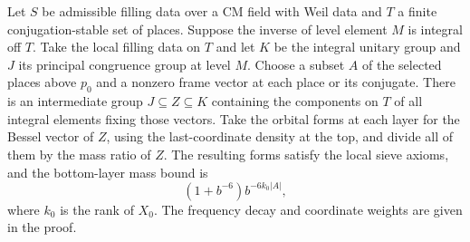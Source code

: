\begin{lemma}
\label{lem:b-finite-sieve}
\emitthmsource
Let $S$ be admissible filling data over a CM field with Weil data and $T$ a finite conjugation-stable set of places.
Suppose the inverse of level element $M$ is integral off $T$. Take the local filling data on $T$ and let $K$ be the integral unitary group
and $J$ its principal congruence group at level $M$.
Choose a subset $A$ of the selected places above $p_0$ and a nonzero frame vector at each place or its conjugate.
There is an intermediate group $J\subseteq Z\subseteq K$ containing the components on $T$ of all integral elements fixing those vectors.
Take the orbital forms at each layer for the Bessel vector of $Z$, using the last-coordinate density at the top,
and divide all of them by the mass ratio of $Z$. The resulting forms satisfy the local sieve axioms, and the bottom-layer mass bound is
\[
 (1+b^{-6})b^{-6k_0|A|},
\]
where $k_0$ is the rank of $X_0$. The frequency decay and coordinate weights are given in the proof.
\end{lemma}
